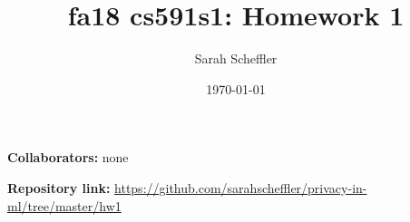 \documentclass{article}
\title{fa18 cs591s1: Homework 1}
\author{Sarah Scheffler}
\date{\today}
\begin{document}
\maketitle
\textbf{Collaborators: } none

\textbf{Repository link: } \href{https://github.com/sarahscheffler/privacy-in-ml/tree/master/hw1}{https://github.com/sarahscheffler/privacy-in-ml/tree/master/hw1}




\end{document}
